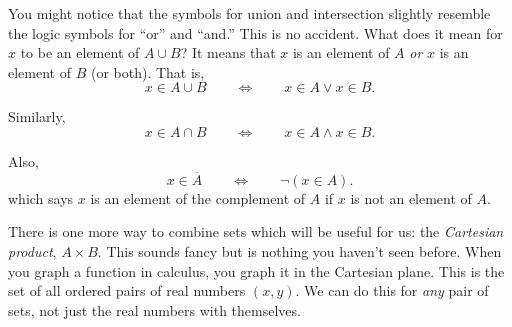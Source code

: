 \documentclass[10pt,]{book}
\theoremstyle{plain}
\theoremstyle{definition}
\theoremstyle{definition}
\theoremstyle{definition}
\def\Iff{\Leftrightarrow}
\renewcommand{\bar}{\overline}
\begin{document}
      You might notice that the symbols for union and intersection slightly resemble the logic symbols for ``or'' and ``and.'' This is no accident. What does it mean for \(x\) to be an element of \(A\cup B\)? It means that \(x\) is an element of \(A\) \emph{or} \(x\) is an element of \(B\) (or both). That is,
      \begin{equation*}
        x \in A \cup B \qquad \Iff \qquad x \in A \vee x \in B.
      \end{equation*}
\par

      Similarly,
      \begin{equation*}
        x \in A \cap B \qquad \Iff \qquad x \in A \wedge x \in B.
      \end{equation*}
\par

      Also,
      \begin{equation*}
        x \in \bar A \qquad \Iff \qquad \neg (x \in A).
      \end{equation*}
      which says \(x\) is an element of the complement of \(A\) if \(x\) is not an element of \(A\).
\par

      There is one more way to combine sets which will be useful for us: the \emph{Cartesian product}, \(A \times B\). This sounds fancy but is nothing you haven't seen before. When you graph a function in calculus, you graph it in the Cartesian plane. This is the set of all ordered pairs of real numbers \((x,y)\). We can do this for \emph{any} pair of sets, not just the real numbers with themselves.
\par
\end{document}
